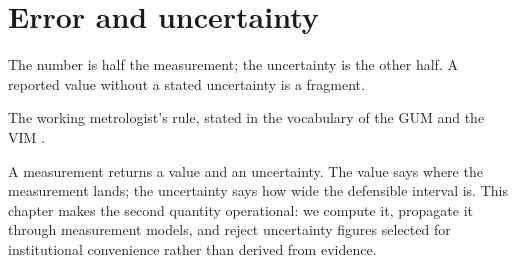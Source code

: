\chapter{Error and uncertainty}
\label{vol01:ch04}

\epigraph{The number is half the measurement; the uncertainty is the
other half. A reported value without a stated uncertainty is a
fragment.}{The working metrologist's rule, stated in the vocabulary
of the GUM \cite{std:iso-iec-guide98} and the VIM
\cite{std:jcgm-vim}.}


\noindent
A measurement returns a value and an uncertainty. The value says
where the measurement lands; the uncertainty says how wide the
defensible interval is. This chapter makes the second quantity
operational: we compute it, propagate it through measurement models,
and reject uncertainty figures selected for institutional convenience
rather than derived from evidence.

